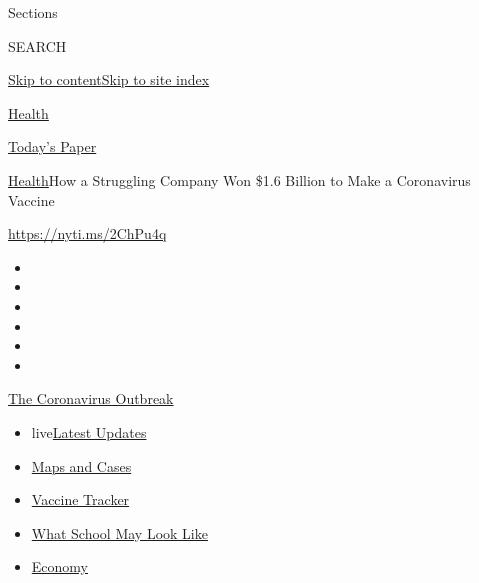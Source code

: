 Sections

SEARCH

\protect\hyperlink{site-content}{Skip to
content}\protect\hyperlink{site-index}{Skip to site index}

\href{https://www.nytimes3xbfgragh.onion/section/health}{Health}

\href{https://myaccount.nytimes3xbfgragh.onion/auth/login?response_type=cookie\&client_id=vi}{}

\href{https://www.nytimes3xbfgragh.onion/section/todayspaper}{Today's
Paper}

\href{/section/health}{Health}\textbar{}How a Struggling Company Won
\$1.6 Billion to Make a Coronavirus Vaccine

\url{https://nyti.ms/2ChPu4q}

\begin{itemize}
\item
\item
\item
\item
\item
\item
\end{itemize}

\href{https://www.nytimes3xbfgragh.onion/news-event/coronavirus?action=click\&pgtype=Article\&state=default\&region=TOP_BANNER\&context=storylines_menu}{The
Coronavirus Outbreak}

\begin{itemize}
\tightlist
\item
  live\href{https://www.nytimes3xbfgragh.onion/2020/08/02/world/coronavirus-updates.html?action=click\&pgtype=Article\&state=default\&region=TOP_BANNER\&context=storylines_menu}{Latest
  Updates}
\item
  \href{https://www.nytimes3xbfgragh.onion/interactive/2020/us/coronavirus-us-cases.html?action=click\&pgtype=Article\&state=default\&region=TOP_BANNER\&context=storylines_menu}{Maps
  and Cases}
\item
  \href{https://www.nytimes3xbfgragh.onion/interactive/2020/science/coronavirus-vaccine-tracker.html?action=click\&pgtype=Article\&state=default\&region=TOP_BANNER\&context=storylines_menu}{Vaccine
  Tracker}
\item
  \href{https://www.nytimes3xbfgragh.onion/interactive/2020/07/29/us/schools-reopening-coronavirus.html?action=click\&pgtype=Article\&state=default\&region=TOP_BANNER\&context=storylines_menu}{What
  School May Look Like}
\item
  \href{https://www.nytimes3xbfgragh.onion/live/2020/07/31/business/stock-market-today-coronavirus?action=click\&pgtype=Article\&state=default\&region=TOP_BANNER\&context=storylines_menu}{Economy}
\end{itemize}

